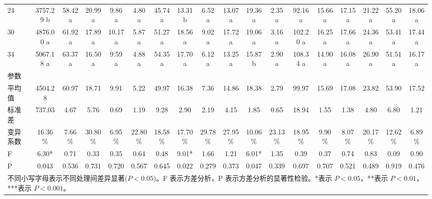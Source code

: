 \documentclass[UTF8,oneside,openany,driverfallback=dvipdfmx,pdfencoding=unicode,hidelinks]{jlutex}
\begin{document}
\begin{table}
\begin{tabular}{lccccccccccccccccc}
			\midrule
			24 & 3757.29 b & 58.42 a & 20.99 a & 9.86 a & 4.80 a & 45.74 a & 13.31 b & 6.52 a & 13.07 a & 19.36 a & 2.35 a & 92.16 a & 15.66 a & 17.15 a & 21.22 a & 55.20 a & 18.06 a \\
			30 & 4876.00 a & 61.92 a & 17.89 a & 10.17 a & 5.87 a & 51.27 a & 18.56 a & 9.02 a & 17.72 a & 19.06 a & 3.16 a & 102.20 a & 16.25 a & 17.66 a & 24.36 a & 53.41 a & 17.44 a \\
			34 & 5067.18 a & 63.37 a & 16.50 a & 9.59 a & 4.88 a & 54.35 a & 17.70 a & 6.12 a & 13.25 a & 15.87 b & 2.90 a & 108.34 a & 14.90 a & 16.08 a & 26.90 a & 51.51 a & 16.17 a \\
			\hdashline
			参数 & & & & & & & & & & & & & & & & & \\
		    平均值 & 4504.28 & 60.97 & 18.71 & 9.91 & 5.22 & 49.97 & 16.38 & 7.36 & 14.86 & 18.38 & 2.79 & 99.97 & 15.69 & 17.08 & 23.82 & 53.90 & 17.52 \\
			标准差 & 737.03 & 4.67 & 5.76 & 0.69 & 1.19 & 9.28 & 2.90 & 2.19 & 4.15 & 1.85 & 0.65 & 18.94 & 1.55 & 1.38 & 4.80 & 6.80 & 1.21 \\
			变异系数 & 16.36\% & 7.66\% & 30.80\% & 6.95\% & 22.80\% & 18.58\% & 17.70\% & 29.78\% & 27.95\% & 10.06\% & 23.13\% & 18.95\% & 9.90\% & 8.07\% & 20.17\% & 12.62\% & 6.89\% \\
			F & 6.30* & 0.71 & 0.33 & 0.35 & 0.64 & 0.48 & 9.01* & 1.66 & 1.21 & 6.01* & 1.35 & 0.39 & 0.37 & 0.74 & 0.83 & 0.09 & 0.90 \\
			P & 0.043 & 0.536 & 0.731 & 0.720 & 0.567 & 0.645 & 0.022 & 0.279 & 0.373 & 0.047 & 0.339 & 0.697 & 0.707 & 0.521 & 0.489 & 0.919 & 0.476 \\
			\bottomrule
			\multicolumn{18}{l}{不同小写字母表示不同处理间差异显著($P < 0.05$)。F 表示方差分析，P 表示方差分析的显著性检验。*表示 $P < 0.05$，**表示 $P < 0.01$，***表示 $P < 0.001$。}
		\end{tabular}
		\vspace{0.5cm} %
	

\end{table}
\end{document}
